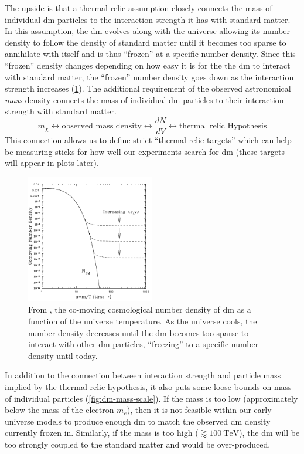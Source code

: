 The upside is that a thermal-relic assumption closely connects the mass of individual \gls{dm} particles
to the interaction strength it has with standard matter. In this assumption, the \gls{dm} evolves along
with the universe allowing its number density to follow the density of standard matter until it becomes
too sparse to annihilate with itself and is thus ``frozen'' at a specific number density. Since this ``frozen''
density changes depending on how easy it is for the the \gls{dm} to interact with standard matter,
the ``frozen'' number density goes down as the interaction strength increases (\cref{fig:number-density}).
The additional requirement of the observed astronomical \emph{mass} density connects
the mass of individual \gls{dm} particles to their interaction strength with standard matter.
$$
      m_\chi \leftrightarrow \text{observed mass density}
      \leftrightarrow \frac{dN}{dV} \leftrightarrow
      \text{thermal relic Hypothesis}
$$
This connection allows us to define strict ``thermal relic targets'' which can help be measuring
sticks for how well our experiments search for \gls{dm} (these targets will appear in plots later).

\begin{figure}
      \centering
      \includegraphics[width=0.5\textwidth]{figures/theory/number-density-at-freeze-out.png}
      \caption{
            From \cite{thermal-freezeout-diagram-1996}, the co-moving cosmological number density of \gls{dm} as a function of the universe
            temperature. As the universe cools, the number density decreases until the \gls{dm}
            becomes too sparse to interact with other \gls{dm} particles, ``freezing'' to a specific
            number density until today.
      }
      \label{fig:number-density}
\end{figure}

In addition to the connection between interaction strength and particle mass implied by the thermal
relic hypothesis, it also puts some loose bounds on mass of individual particles (\cref{fig:dm-mass-scale}).
If the mass is too low (approximately below the mass of the electron $m_e$), then it is not feasible within our early-universe models to produce enough
\gls{dm} to match the observed \gls{dm} density currently frozen in. Similarly, if the mass is too
high ($\gtrapprox 100~\text{TeV}$), the \gls{dm} will be too strongly coupled to the standard matter and would be over-produced.

